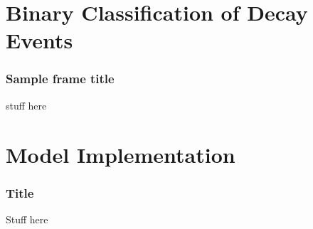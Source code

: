 \documentclass{beamer}
\begin{document}
\section{Binary Classification of Decay Events}

\begin{frame}
\frametitle{Sample frame title}
	stuff here
\end{frame}



\section{Model Implementation}

\begin{frame}
\frametitle{Title}
	Stuff here
\end{frame}
\end{document}
